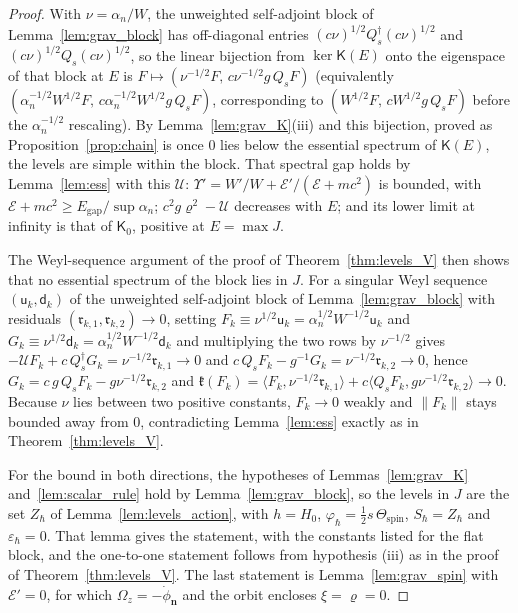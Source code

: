 \documentclass[aps,prd,onecolumn,tightenlines,nofootinbib,notitlepage,11pt,floatfix]{revtex4-2}
\theoremstyle{indentedtheorem}
\begin{document}
\begin{proof}
With $\nu=\alpha_n/W$, the unweighted self-adjoint block of Lemma~\ref{lem:grav_block} has off-diagonal entries $(c\nu)^{1/2}Q_s^\dagger(c\nu)^{1/2}$ and $(c\nu)^{1/2}Q_s(c\nu)^{1/2}$, so the linear bijection from $\ker\mathsf{K}(E)$ onto the eigenspace of that block at $E$ is $F\mapsto(\nu^{-1/2}F,\,c\nu^{-1/2}g\,Q_sF)$ (equivalently $(\alpha_n^{-1/2}W^{1/2}F,\,c\alpha_n^{-1/2}W^{1/2}g\,Q_sF)$, corresponding to $(W^{1/2}F,\,cW^{1/2}g\,Q_sF)$ before the $\alpha_n^{-1/2}$ rescaling). By Lemma~\ref{lem:grav_K}(iii) and this bijection, proved as Proposition~\ref{prop:chain} is once $0$ lies below the essential spectrum of $\mathsf{K}(E)$, the levels are simple within the block. That spectral gap holds by Lemma~\ref{lem:ess} with this $\mathcal{U}$: $\Upsilon'=W'/W+\mathcal{E}'/(\mathcal{E}+mc^2)$ is bounded, with $\mathcal{E}+mc^2\geq E_\text{gap}/\sup\alpha_n$; $c^2g\varrho^2-\mathcal{U}$ decreases with $E$; and its lower limit at infinity is that of $\mathsf{K}_0$, positive at $E=\max J$.

The Weyl-sequence argument of the proof of Theorem~\ref{thm:levels_V} then shows that no essential spectrum of the block lies in $J$. For a singular Weyl sequence $(\mathsf{u}_k,\mathsf{d}_k)$ of the unweighted self-adjoint block of Lemma~\ref{lem:grav_block} with residuals $(\mathfrak{r}_{k,1},\mathfrak{r}_{k,2})\to 0$, setting $F_k\equiv\nu^{1/2}\mathsf{u}_k=\alpha_n^{1/2}W^{-1/2}\mathsf{u}_k$ and $G_k\equiv\nu^{1/2}\mathsf{d}_k=\alpha_n^{1/2}W^{-1/2}\mathsf{d}_k$ and multiplying the two rows by $\nu^{-1/2}$ gives $-\mathcal{U}F_k+c\,Q_s^\dagger G_k=\nu^{-1/2}\mathfrak{r}_{k,1}\to 0$ and $c\,Q_sF_k-g^{-1}G_k=\nu^{-1/2}\mathfrak{r}_{k,2}\to 0$, hence $G_k=c\,g\,Q_sF_k-g\nu^{-1/2}\mathfrak{r}_{k,2}$ and $\mathfrak{k}(F_k)=\langle F_k,\nu^{-1/2}\mathfrak{r}_{k,1}\rangle+c\langle Q_sF_k,g\nu^{-1/2}\mathfrak{r}_{k,2}\rangle\to 0$. Because $\nu$ lies between two positive constants, $F_k\to 0$ weakly and $\|F_k\|$ stays bounded away from $0$, contradicting Lemma~\ref{lem:ess} exactly as in Theorem~\ref{thm:levels_V}.

For the bound in both directions, the hypotheses of Lemmas~\ref{lem:grav_K} and~\ref{lem:scalar_rule} hold by Lemma~\ref{lem:grav_block}, so the levels in $J$ are the set $Z_\hbar$ of Lemma~\ref{lem:levels_action}, with $h=H_0$, $\varphi_\hbar=\tfrac{1}{2}s\,\Theta_\text{spin}$, $S_\hbar=Z_\hbar$ and $\varepsilon_\hbar=0$. That lemma gives the statement, with the constants listed for the flat block, and the one-to-one statement follows from hypothesis (iii) as in the proof of Theorem~\ref{thm:levels_V}. The last statement is Lemma~\ref{lem:grav_spin} with $\mathcal{E}'=0$, for which $\Omega_z=-\dot{\phi}_\mathbf{n}$ and the orbit encloses $\xi=\varrho=0$.
\end{proof}
\end{document}
